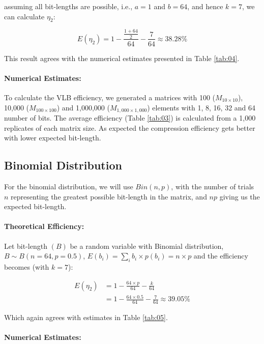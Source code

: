 \documentclass[10pt]{article}
\begin{document}
\noindent assuming all bit-lengths are possible, i.e., $a=1$ and $b=64$, and 
hence $k=7$, we can calculate $\eta_2$: 

\begin{equation}\label{eq:45}
 E(\eta_2) = 1 - \frac{\frac{1+64}{2}}{64} - \frac{7}{64} \approx 38.28\% 
\end{equation}

This result agrees with the numerical estimates presented in Table \ref{tab:04}.

\paragraph{Numerical Estimates:}

To calculate the VLB efficiency, we generated a matrices with 100 ($M_{10 \times 
10}$), 10,000 ($M_{100 \times 100}$) and 1,000,000 ($M_{1,000 \times 1,000}$) 
elements with 1, 8, 16, 32 and 64 number of bits.  The average efficiency (Table 
\ref{tab:03}) is calculated from a 1,000 replicates of each matrix size. As 
expected the compression efficiency gets better with lower expected bit-length.

\subsection*{Binomial Distribution}

For the binomial distribution, we will use $Bin(n, p)$, with the number of 
trials $n$ representing the greatest possible bit-length in the matrix, and $np$ 
giving us the expected bit-length. 

\paragraph{Theoretical Efficiency:}
Let bit-length $(B)$ be a random variable with Binomial distribution, $B \sim 
B(n=64,p=0.5)$, $E(b_i) = \sum_{i} b_i \times p(b_i) = n \times p$ and the 
efficiency becomes (with $k=7$):

\begin{align}\label{eq:47}
 E(\eta_2) &= 1 - \frac{64 \times p }{64} - \frac{k}{64}  \\
  &= 1 - \frac{64 \times 0.5 }{64} - \frac{7}{64} \approx 39.05\% \nonumber
\end{align}

Which again agrees with estimates in Table \ref{tab:05}.

\paragraph{Numerical Estimates:}
\end{document}
